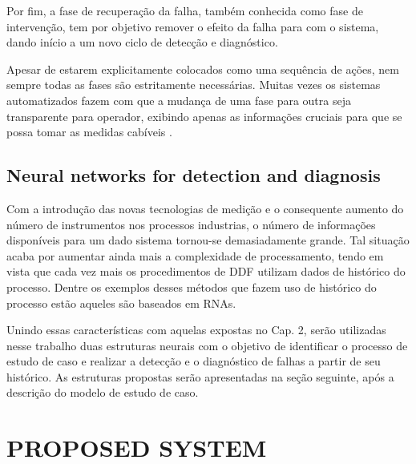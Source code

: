 \documentclass[10pt,fleqn,a4paper]{article}
\begin{document}
Por fim, a fase de recuperação da falha, também conhecida como fase de
intervenção, tem por objetivo remover o efeito da falha para com o sistema,
dando início a um novo ciclo de detecção e diagnóstico.

Apesar de estarem explicitamente colocados como uma sequência de ações, nem
sempre todas as fases são estritamente necessárias. Muitas vezes os sistemas
automatizados fazem com que a mudança de uma fase para outra seja transparente
para operador, exibindo apenas as informações cruciais para que se possa tomar
as medidas cabíveis \citep{chiang:2001}.

\subsection{Neural networks for detection and diagnosis}
Com a introdução das novas tecnologias de medição e o consequente aumento do
número de instrumentos nos processos industrias, o número de informações
disponíveis para um dado sistema tornou-se demasiadamente grande. Tal situação
acaba por aumentar ainda mais a complexidade de processamento, tendo em vista
que cada vez mais os procedimentos de DDF utilizam dados de histórico do
processo. Dentre os exemplos desses métodos que fazem uso de histórico do
processo estão aqueles são baseados em RNAs.

Unindo essas características com aquelas expostas no Cap. 2, serão utilizadas
nesse trabalho duas estruturas neurais com o objetivo de identificar o processo
de estudo de caso e realizar a detecção e o diagnóstico de falhas a partir de
seu histórico.  As estruturas propostas serão apresentadas na seção seguinte,
após a descrição do modelo de estudo de caso.

\section{PROPOSED SYSTEM}\label{sec:proposed}

\end{document}
